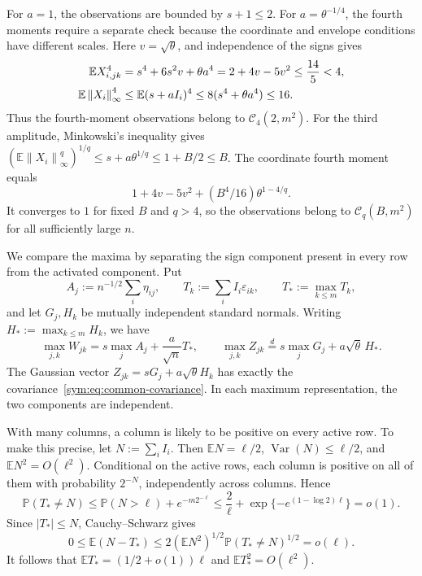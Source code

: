 \documentclass[11pt,letterpaper]{article}
\theoremstyle{remark}
\newcommand{\E}{\mathbb E}
\newcommand{\Pp}{\mathbb P}
\newcommand{\Var}{\operatorname{Var}}
\newcommand{\norm}[1]{\left\lVert#1\right\rVert}
\begin{document}
For \(a=1\), the observations are bounded by \(s+1\le2\).
For \(a=\theta^{-1/4}\), the fourth moments require a separate
check because the coordinate and envelope conditions have different
scales. Here \(v=\sqrt\theta\), and independence of the signs gives
\begin{align}
 \E X_{i,jk}^4
 &=s^4+6s^2v+\theta a^4
   =2+4v-5v^2\le\frac{14}{5}<4,\notag\\
 \E\norm{X_i}_\infty^4
 &\le\E(s+aI_i)^4
   \le8(s^4+\theta a^4)\le16.
 \label{sym:eq:q4-moments}
\end{align}
Thus the fourth-moment observations belong to \(\mathcal C_4(2,m^2)\).
For the third amplitude, Minkowski's inequality gives
\((\E\norm{X_i}_\infty^q)^{1/q}\le s+a\theta^{1/q}\le1+B/2\le B\).
The coordinate fourth moment equals
\[
  1+4v-5v^2+(B^4/16)\theta^{1-4/q}.
\]
It converges to \(1\) for fixed \(B\) and \(q>4\), so the observations
belong to \(\mathcal C_q(B,m^2)\) for all sufficiently large \(n\).

We compare the maxima by separating the sign component present in
every row from the activated component. Put
\[
 A_j:=n^{-1/2}\sum_i\eta_{ij},\qquad
 T_k:=\sum_iI_i\varepsilon_{ik},\qquad
 T_*:=\max_{k\le m}T_k,
\]
and let \(G_j,H_k\) be mutually independent standard normals.
Writing \(H_*:=\max_{k\le m}H_k\), we have
\begin{equation}
 \max_{j,k}W_{jk}=s\max_jA_j+\frac a{\sqrt n}T_*,
 \qquad
 \max_{j,k}Z_{jk}\stackrel d=s\max_jG_j+a\sqrt\theta\,H_*.
 \label{sym:eq:common-maxima}
\end{equation}
The Gaussian vector \(Z_{jk}=sG_j+a\sqrt\theta H_k\) has exactly
the covariance~\eqref{sym:eq:common-covariance}. In each maximum
representation, the two components are independent.

With many columns, a column is likely to be positive on every active
row. To make this precise, let \(N:=\sum_iI_i\). Then
\(\E N=\ell/2\), \(\Var(N)\le\ell/2\), and
\(\E N^2=O(\ell^2)\). Conditional on the active rows, each column
is positive on all of them with probability \(2^{-N}\), independently
across columns. Hence
\[
 \Pp(T_*\ne N)\le\Pp(N>\ell)+e^{-m2^{-\ell}}
 \le\frac2\ell+\exp\{-e^{(1-\log2)\ell}\}=o(1).
\]
Since \(|T_*|\le N\), Cauchy--Schwarz gives
\[
 0\le\E(N-T_*)\le2(\E N^2)^{1/2}
       \Pp(T_*\ne N)^{1/2}=o(\ell).
\]
It follows that \(\E T_*=(1/2+o(1))\ell\) and
\(\E T_*^2=O(\ell^2)\).
\end{document}
